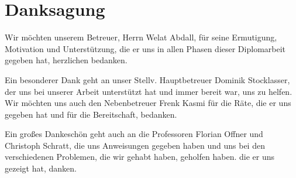 \chapter*{Danksagung}

Wir möchten unserem Betreuer, Herrn Welat Abdall, für seine Ermutigung, Motivation und Unterst\"utzung, die er uns in allen Phasen dieser Diplomarbeit gegeben hat, herzlichen bedanken. 

Ein besonderer Dank geht an unser Stellv. Hauptbetreuer Dominik Stocklasser, der uns bei unserer Arbeit unterstützt hat und immer bereit war, uns zu helfen. Wir möchten uns auch den Nebenbetreuer Frenk Kasmi f\"ur die Räte, die er uns gegeben hat und für die Bereitschaft, bedanken.  

Ein großes Dankeschön geht auch an die Professoren Florian Offner und Christoph Schratt, die uns Anweisungen gegeben haben und uns bei den verschiedenen Problemen, die wir gehabt haben, geholfen haben.
  die er uns gezeigt hat, danken.